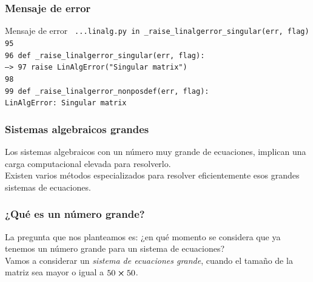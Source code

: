 \begin{frame}[fragile]
\frametitle{Mensaje de error}
\fontsize{12}{12}\selectfont
\begin{exampleblock}{Mensaje de error}
\texttt{
   ...linalg.py in \_raise\_linalgerror\_singular(err, flag)\\
   95 \\
   96 def \_raise\_linalgerror\_singular(err, flag):\\
---> 97     raise LinAlgError("Singular matrix") \\
   98 \\
   99 def \_raise\_linalgerror\_nonposdef(err, flag):\\
LinAlgError: Singular matrix}
\end{exampleblock}
\end{frame}
\begin{frame}
\frametitle{Sistemas algebraicos grandes}
Los sistemas algebraicos con un número muy grande de ecuaciones, implican una carga computacional elevada para resolverlo.
\\
\bigskip
Existen varios métodos especializados para resolver eficientemente esos grandes sistemas de ecuaciones.
\end{frame}
\begin{frame}
\frametitle{¿Qué es un número grande?}
La pregunta que nos planteamos es: ¿en qué momento se considera que ya tenemos un número grande para un sistema de ecuaciones?
\\
\bigskip
\pause
Vamos a considerar un \emph{sistema de ecuaciones grande}, cuando el tamaño de la matriz sea mayor o igual a $50 \cp 50$.
\end{frame}
